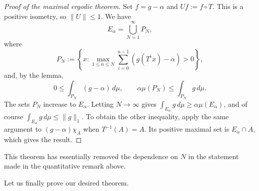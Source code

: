 \documentclass[11pt,a4paper]{article}
\begin{document}

\begin{proof}[Proof of the maximal ergodic theorem]
Set $f=g-\alpha$ and $Uf:=f\circ T$. This is a positive isometry, so
$\|U\|\leq1$. We have
\[
 E_\alpha=\bigcup_{N=1}^\infty P_N,
\]
where
\[
 P_N:=\left\{x:\max_{1\leq n\leq N}
 \sum_{i=0}^{n-1}(g(T^ix)-\alpha)>0\right\},
\]
and, by the lemma,
\[
 0\leq\int_{P_N}(g-\alpha)\,d\mu,
 \qquad \alpha\mu(P_N)\leq\int_{P_N}g\,d\mu.
\]
The sets $P_N$ increase to $E_\alpha$. Letting $N\to\infty$ gives
$\int_{E_\alpha}g\,d\mu\geq\alpha\mu(E_\alpha)$, and of course
$\int_{E_\alpha}g\,d\mu\leq\|g\|_1$. To obtain the other inequality, apply
the same argument to $(g-\alpha)\chi_A$ when $T^{-1}(A)=A$. Its positive
maximal set is $E_\alpha\cap A$, which gives the result.
\end{proof}

\begin{remark}
This theorem has essentially removed the dependence on $N$ in the
statement made in the quantitative remark above.
\end{remark}
Let us finally prove our desired theorem.
\end{document}
